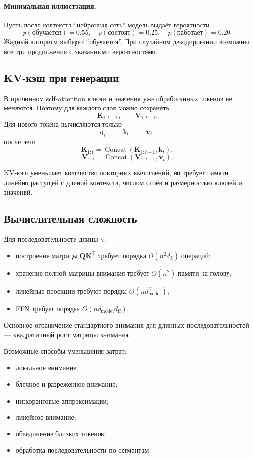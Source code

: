 \documentclass[12pt,a4paper]{article}
\theoremstyle{definition}
\newcommand{\1}{\mathbf{1}}
\begin{document}
\paragraph{Минимальная иллюстрация.}
Пусть после контекста ``нейронная сеть'' модель выдаёт вероятности
\[
    p(\text{обучается})=0.55,\quad
    p(\text{состоит})=0.25,\quad
    p(\text{работает})=0.20.
\]
Жадный алгоритм выберет ``обучается''. При случайном декодировании
возможны все три продолжения с указанными вероятностями.

\subsection{KV-кэш при генерации}

В причинном self-attention ключи и значения уже обработанных токенов
не меняются. Поэтому для каждого слоя можно сохранять
\[
    \bm{K}_{1:t-1},\qquad \bm{V}_{1:t-1}.
\]
Для нового токена вычисляются только
\[
    \bm{q}_t,\qquad \bm{k}_t,\qquad \bm{v}_t,
\]
после чего
\[
    \bm{K}_{1:t}
    =
    \operatorname{Concat}(\bm{K}_{1:t-1},\bm{k}_t),
\]
\[
    \bm{V}_{1:t}
    =
    \operatorname{Concat}(\bm{V}_{1:t-1},\bm{v}_t).
\]

KV-кэш уменьшает количество повторных вычислений, но требует памяти,
линейно растущей с длиной контекста, числом слоёв и размерностью
ключей и значений.

\subsection{Вычислительная сложность}

Для последовательности длины $n$:
\begin{itemize}
    \item построение матрицы $\bm{Q}\bm{K}^{\top}$ требует порядка
    $O(n^2d_k)$ операций;
    \item хранение полной матрицы внимания требует $O(n^2)$ памяти
    на голову;
    \item линейные проекции требуют порядка $O(nd_{\text{model}}^2)$;
    \item FFN требует порядка
    $O(nd_{\text{model}}d_{\text{ff}})$.
\end{itemize}

Основное ограничение стандартного внимания для длинных
последовательностей --- квадратичный рост матрицы внимания.

Возможные способы уменьшения затрат:
\begin{itemize}
    \item локальное внимание;
    \item блочное и разреженное внимание;
    \item низкоранговые аппроксимации;
    \item линейное внимание;
    \item объединение близких токенов;
    \item обработка последовательности по сегментам.
\end{itemize}
\end{document}
